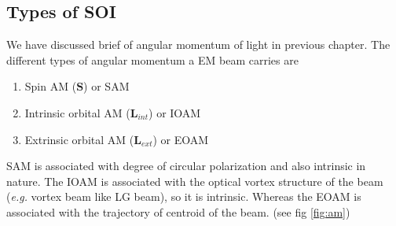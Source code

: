 \documentclass[11pt,a4paper]{article}
\numberwithin{equation}{section}
\begin{document}

\subsection{Types of SOI}
We have discussed brief of angular momentum of light in previous chapter. The different types of angular momentum a EM beam carries are
\begin{enumerate}
	\item Spin AM ($\boldsymbol{S}$) or SAM
	\item Intrinsic orbital AM ($\boldsymbol{L}_{int}$) or IOAM
	\item Extrinsic orbital AM ($\boldsymbol{L}_{ext}$) or EOAM
\end{enumerate}
SAM is associated with degree of circular polarization and also intrinsic in nature. The IOAM is associated with the optical vortex structure of the beam (\textit{e.g.} vortex beam like LG beam), so it is intrinsic. Whereas the EOAM is associated with the trajectory of centroid of the beam.\cite{bliokh 12} (see fig \ref{fig:am}) 
\end{document}
